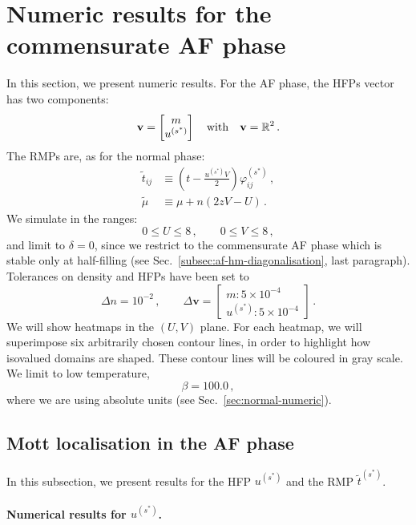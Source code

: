 \section{Numeric results for the commensurate AF phase}\label{sec:af-numeric}

In this section, we present numeric results. For the AF phase, the HFPs vector has two components:
\[
\mathbf{v} = \begin{bmatrix}
	m \\ u^{(s^*)}
\end{bmatrix}
\qq{with}
\mathbf{v} = \mathbb{R}^2 \, .
\]
The RMPs are, as for the normal phase:
\[
\begin{aligned}
	\tilde{t}_{ij} &\equiv \left(
	t - \frac{u^{(s^*)}V}{2}
	\right) \varphi_{ij}^{(s^*)} \, , \\
	\tilde{\mu} &\equiv \mu + n (2zV-U) \, .
\end{aligned}
\]
We simulate in the ranges:
\[
0 \le U \le 8 \, ,
\qquad
0 \le V \le 8 \, ,
\]
and limit to $\delta=0$, since we restrict to the commensurate AF phase which is stable only at half-filling (see Sec.~\ref{subsec:af-hm-diagonalisation}, last paragraph). Tolerances on density and HFPs have been set to
\[
\Delta n = 10^{-2} \, ,
\qquad
\Delta \mathbf{v} = \begin{bmatrix}
	m \colon 5 \times 10^{-4} \\
	u^{(s^*)} \colon 5 \times 10^{-4}
\end{bmatrix} \, .
\]
We will show heatmaps in the $(U,V)$ plane. For each heatmap, we will superimpose six arbitrarily chosen contour lines, in order to highlight how isovalued domains are shaped. These contour lines will be coloured in gray scale. We limit to low temperature,
\[
	\beta = 100.0 \, ,
\]
where we are using absolute units (see Sec.~\ref{sec:normal-numeric}).

\subsection{Mott localisation in the AF phase}

In this subsection, we present results for the HFP $u^{(s^*)}$ and the RMP $\tilde{t}^{(s^*)}$.

\paragraph{Numerical results for $u^{(s^*)}$.}

